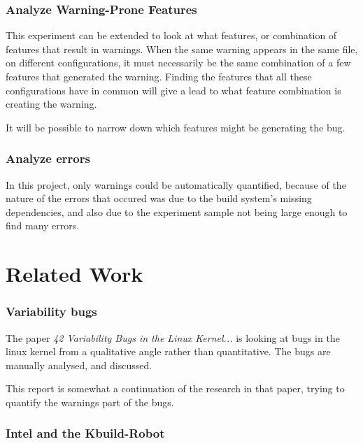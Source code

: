 \documentclass[a4paper,11pt]{report}
\begin{document}
            \subsection*{Analyze Warning-Prone Features}

This experiment can be extended to look at what features, or combination of 
features that result in warnings. When the same warning appears in the same 
file, on different configurations, it must necessarily be the same combination 
of a few features that generated the warning. Finding the features that all these
configurations have in common will give a lead to what feature combination is 
creating the warning.

It will be possible to narrow down which features might be generating the bug.


            \subsection*{Analyze errors}

In this project, only warnings could be automatically quantified, because of the
nature of the errors that occured was due to the build system's missing 
dependencies, and also due to the experiment sample not being large enough to 
find many errors.


            \newpage
            \chapter{Related Work}

            \subsection*{Variability bugs}
The paper \emph{42 Variability Bugs in the Linux Kernel...}\cite{42bugs} is 
looking at bugs in the linux kernel from a qualitative angle rather than 
quantitative.  The bugs are manually analysed, and discussed.

This report is somewhat a continuation of the research in that paper, trying to 
quantify the warnings part of the bugs.


            \subsection*{Intel and the Kbuild-Robot}
\end{document}
